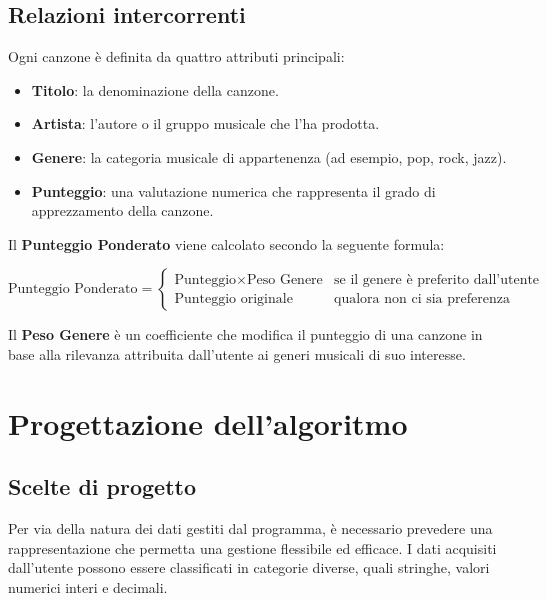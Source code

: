 \documentclass[a4paper,11pt]{article}
\begin{document}
    \subsection{Relazioni intercorrenti}
    Ogni canzone è definita da quattro attributi principali:
    \begin{itemize}
        \item \textbf{Titolo}: la denominazione della canzone.
        \item \textbf{Artista}: l’autore o il gruppo musicale che l’ha prodotta.
        \item \textbf{Genere}: la categoria musicale di appartenenza (ad esempio, pop, rock, jazz).
        \item \textbf{Punteggio}: una valutazione numerica che rappresenta il grado di apprezzamento della canzone.
    \end{itemize}

    Il \textbf{Punteggio Ponderato} viene calcolato secondo la seguente formula:
    \begin{center}
        \textit{
            \[
                \text{Punteggio Ponderato} =
                \begin{cases}
                    \text{Punteggio} \times \text{Peso Genere} & \text{se il genere è preferito dall’utente} \\
                    \text{Punteggio originale} & \text{qualora non ci sia preferenza}
                \end{cases}
            \]
        }
    \end{center}

    \noindent
    Il \textbf{Peso Genere} è un coefficiente che modifica il punteggio di una canzone in base alla rilevanza attribuita dall'utente ai generi musicali di suo interesse.

    \newpage
    \section{Progettazione dell'algoritmo}
    \subsection{Scelte di progetto}
    Per via della natura dei dati gestiti dal programma, è necessario prevedere una rappresentazione che permetta una gestione flessibile ed efficace. I dati acquisiti dall'utente possono essere classificati in categorie diverse, quali stringhe, valori numerici interi e decimali.
\end{document}
